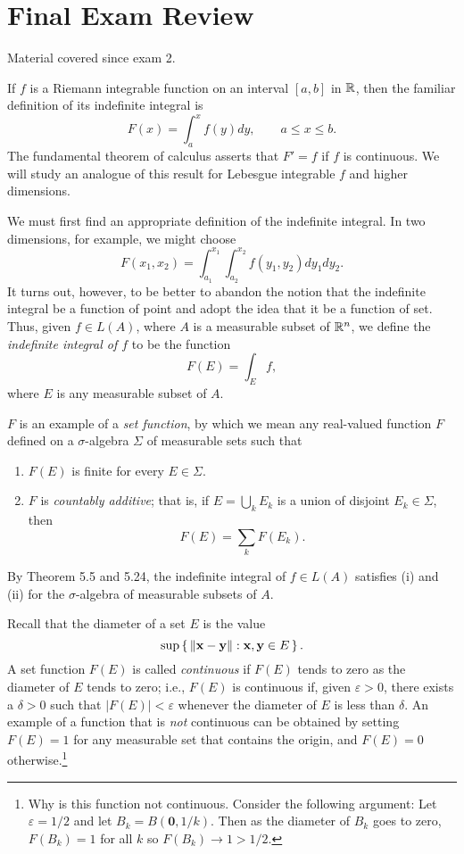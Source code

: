 \section{Final Exam Review}
Material covered since exam 2.

\bigskip

If $f$ is a Riemann integrable function on an interval $[a,b]$ in $\mathbb{R}$,
then the familiar definition of its indefinite integral is
\[
F(x)=\int_a^x f(y)dy,\qquad a\leq x\leq b.
\]
The fundamental theorem of calculus asserts that $F'=f$ if $f$ is
continuous. We will study an analogue of this result for Lebesgue
integrable $f$ and higher dimensions.

We must first find an appropriate definition of the indefinite integral. In
two dimensions, for example, we might choose
\[
F(x_1,x_2)=\int_{a_1}^{x_1}\int_{a_2}^{x_2}f(y_1,y_2)dy_1dy_2.
\]
It turns out, however, to be better to abandon the notion that the
indefinite integral be a function of point and adopt the idea that it be a
function of set. Thus, given $f\in L(A)$, where $A$ is a measurable
subset of $\mathbb{R}^n$, we define the \emph{indefinite integral of $f$} to be
the function
\[
F(E)=\int_E f,
\]
where $E$ is any measurable subset of $A$.

$F$ is an example of a \emph{set function}, by which we mean any
real-valued function $F$ defined on a $\sigma$-algebra $\Sigma$ of
measurable sets such that
\begin{enumerate}[label=(\roman*)]
\item $F(E)$ is finite for every $E\in\Sigma$.
\item $F$ is \emph{countably additive}; that is, if $E=\bigcup_k E_k$ is a
  union of disjoint $E_k\in\Sigma$, then
\[
F(E)=\sum_k F(E_k).
\]
\end{enumerate}
By Theorem 5.5 and 5.24, the indefinite integral of $f\in L(A)$ satisfies
(i) and (ii) for the $\sigma$-algebra of measurable subsets of $A$.

Recall that the diameter of a set $E$ is the value
\[
\sup\left\{\,\|\mathbf{x}-\mathbf{y}\|:\mathbf{x},\mathbf{y}\in E\,\right\}.
\]
A set function $F(E)$ is called \emph{continuous} if $F(E)$ tends to zero
as the diameter of $E$ tends to zero; i.e., $F(E)$ is continuous if, given
$\varepsilon>0$, there exists a $\delta>0$ such that $|F(E)|<\varepsilon$
whenever the diameter of $E$ is less than $\delta$. An example of a
function that is \emph{not} continuous can be obtained by setting $F(E)=1$
for any measurable set that contains the origin, and $F(E)=0$
otherwise.\footnote{Why is this function not continuous. Consider the
  following argument: Let $\varepsilon=1/2$ and let $B_k=
  B(\mathbf{0},1/k)$. Then as the diameter of $B_k$ goes to zero,
  $F(B_k)=1$ for all $k$ so $F(B_k)\to 1>1/2$.}

